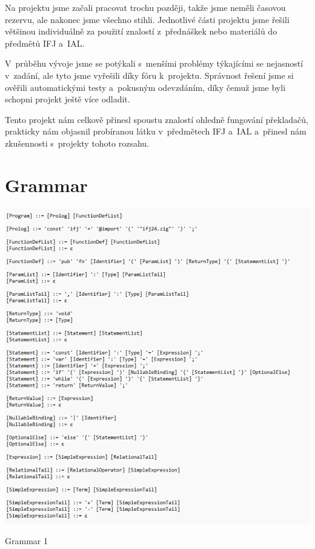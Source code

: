 \documentclass[a4paper, 11pt]{article}
\begin{document}
	Na projektu jsme začali pracovat trochu později, takže jsme neměli časovou rezervu, ale nakonec
	jsme všechno stihli. Jednotlivé části projektu jsme řešili většinou individuálně za použití
	znalostí z~přednáškek nebo materiálů do předmětů IFJ a~IAL.

	V~průběhu vývoje jsme se potýkali s~menšími problémy týkajícími se nejasností v~zadání, ale
	tyto jsme vyřešili díky fóru k~projektu. Správnost řešení jsme si ověřili automatickými
	testy a~pokusným odevzdáním, díky čemuž jsme byli schopni projekt ještě více odladit.

	Tento projekt nám celkově přinesl spoustu znalostí ohledně fungování překladačů, prakticky nám
	objasnil probíranou látku v~předmětech IFJ a~IAL a~přinesl nám zkušennosti s~projekty tohoto rozsahu.

	\clearpage
	\appendix



	\begin{table}[!ht]
        \section{Grammar}
		\centering
		\includegraphics[width=1\linewidth]{Grammar1.pdf}
		\caption{Grammar 1}
		\label{table:png2pdf (1).pdf}
	\end{table}
\end{document}
